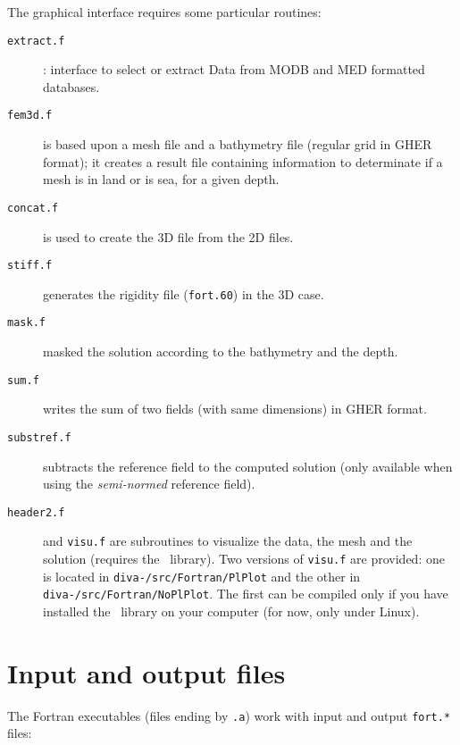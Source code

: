 The graphical interface requires some particular routines:
\begin{description}
\item[\texttt{extract.f}]: interface to select or extract Data from MODB and MED formatted databases.
\vspace{.25cm}
\item[\texttt{fem3d.f}] is based upon a mesh file and a bathymetry file (regular grid in GHER format); it creates a result file containing information to determinate if a mesh is in land or is sea, for a given depth.
\vspace{.25cm}
\item[\texttt{concat.f}] is used to create the 3D file from the 2D files.
\item[\texttt{stiff.f}] generates the rigidity file (\texttt{fort.60}) in the 3D case.
\item[\texttt{mask.f}] masked the solution according to the bathymetry and the depth.
\item[\texttt{sum.f}] writes the sum of two fields (with same dimensions) in GHER format.
\item[\texttt{substref.f}] subtracts the reference field to the computed solution (only available when using the \textit{semi-normed} reference field).
\vspace{.25cm}
\item[\texttt{header2.f}] and \texttt{visu.f} are subroutines to visualize the data, the mesh and the solution (requires the \plplot\, library). Two versions of \texttt{visu.f} are provided: one is located in \texttt{diva-\divaversion/\-src/\-Fortran/\-PlPlot} and the other in \texttt{diva-\divaversion/\-src/\-Fortran/\-NoPlPlot}. The first can be compiled only if you have installed the \plplot\, library on your computer (for now, only under Linux).
\end{description}




\section{Input and output files}

The Fortran executables (files ending by \texttt{.a}) work with input and output \texttt{fort.*} files:

